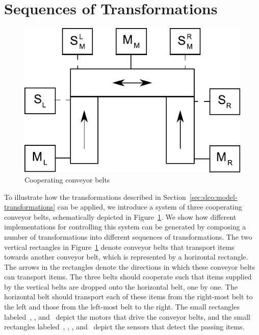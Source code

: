 \section{Sequences of Transformations}
\label{sec:slco:sequences}

\begin{figure}[hbt]
  \centering
  \includegraphics[scale=0.45]{slco/figs/ConveyorExampleOverview}
  \caption{Cooperating conveyor belts}
  \label{fig:ConveyorOverview}
\end{figure}

To illustrate how the transformations described in Section~\ref{sec:slco:model-transformations} can be applied, we introduce a system of three cooperating conveyor belts, schematically depicted in Figure~\ref{fig:ConveyorOverview}.
We show how different implementations for controlling this system can be generated by composing a number of transformations into different sequences of transformations.
The two vertical rectangles in Figure~\ref{fig:ConveyorOverview} denote conveyor belts that transport items towards another conveyor belt, which is represented by a horizontal rectangle.
The arrows in the rectangles denote the directions in which these conveyor belts can transport items.
The three belts should cooperate such that items supplied by the vertical belts are dropped onto the horizontal belt, one by one.
The horizontal belt should transport each of these items from the right-most belt to the left and those from the left-most belt to the right.
The small rectangles labeled~, , and~ depict the motors that drive the conveyor belts, and the small rectangles labeled~, , , and~ depict the sensors that detect the passing items.

